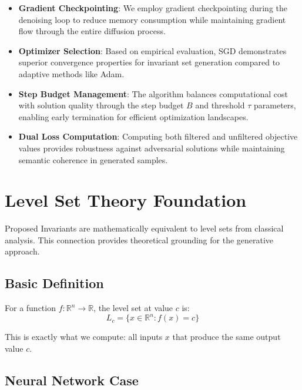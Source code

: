 \documentclass[licencjacka,en]{pracamgr}
\newcommand{\framework}[1]{Invariants}  %
\begin{document}
\begin{itemize}
    \item \textbf{Gradient Checkpointing}: We employ gradient checkpointing during the denoising loop to reduce memory consumption while maintaining gradient flow through the entire diffusion process.
    
    \item \textbf{Optimizer Selection}: Based on empirical evaluation, SGD demonstrates superior convergence properties for invariant set generation compared to adaptive methods like Adam.
    
    \item \textbf{Step Budget Management}: The algorithm balances computational cost with solution quality through the step budget $B$ and threshold $\tau$ parameters, enabling early termination for efficient optimization landscapes.
    
    \item \textbf{Dual Loss Computation}: Computing both filtered and unfiltered objective values provides robustness against adversarial solutions while maintaining semantic coherence in generated samples.
\end{itemize}

\section{Level Set Theory Foundation}\label{appendix:level_sets}

Proposed \framework{} are mathematically equivalent to level sets from classical analysis. This connection provides theoretical grounding for the generative approach.

\subsection{Basic Definition}

For a function $f: \mathbb{R}^n \rightarrow \mathbb{R}$, the level set at value $c$ is:
\begin{equation}
L_c = \{x \in \mathbb{R}^n : f(x) = c\}
\end{equation}

This is exactly what we compute: all inputs $x$ that produce the same output value $c$.

\subsection{Neural Network Case}
\end{document}
